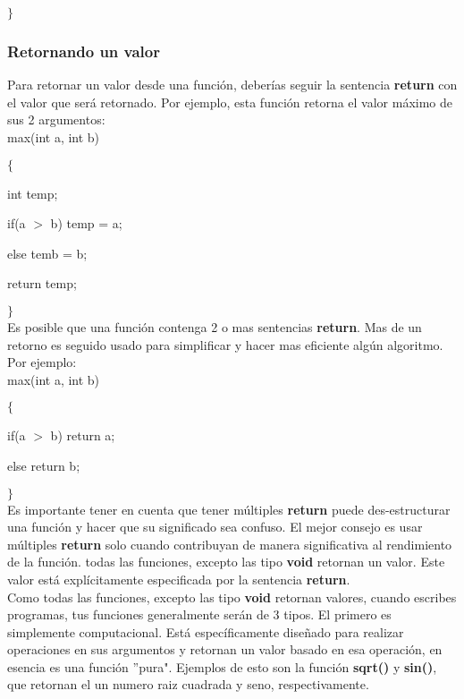\documentclass[]{article}
\begin{document}
	$\rbrace$
	
	\subsubsection{Retornando un valor}
	
	Para retornar un valor desde una función, deberías seguir la sentencia \textbf{return} con el valor que será retornado. Por ejemplo, esta función retorna el valor máximo de sus 2 argumentos:\\
	
	max(int a, int b)
	
	$\lbrace$
	
	int temp;
	
	if(a $>$ b) temp = a;
	
	else temb = b;
	
	return temp;
	
	$\rbrace$\\
	
	Es posible que una función contenga 2 o mas sentencias \textbf{return}. Mas de un retorno es seguido usado para simplificar y hacer mas eficiente algún algoritmo. Por ejemplo:\\
	
	max(int a, int b)
	
	$\lbrace$
	
	if(a $>$ b) return a;
	
	else return b;
	
	$\rbrace$\\
	
	Es importante tener en cuenta que tener múltiples \textbf{return} puede des-estructurar  una función y hacer que su significado sea confuso. El mejor consejo es usar múltiples \textbf{return} solo cuando contribuyan de manera significativa al rendimiento de la función. todas las funciones, excepto las tipo \textbf{void} retornan un valor. Este valor está explícitamente especificada por la sentencia \textbf{return}.\\
	
	Como todas las funciones, excepto las tipo \textbf{void} retornan valores, cuando escribes programas, tus funciones generalmente serán de 3 tipos. El primero es simplemente computacional. Está específicamente diseñado para realizar operaciones en sus argumentos y retornan un valor basado en esa operación, en esencia es una función ''pura". Ejemplos de esto son la función \textbf{sqrt()} y \textbf{sin()}, que retornan el un numero raiz cuadrada y seno, respectivamente.
	
\end{document}
